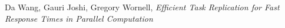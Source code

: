 \documentclass[10pt, conference, compsocconf]{IEEEtran}
\begin{document}

%
%
%
   \begin{thebibliography}{1}


Da Wang, Gauri Joshi, Gregory Wornell, \emph{ Efficient Task Replication for Fast Response Times in Parallel Computation}

\end{thebibliography}

\end{document}
